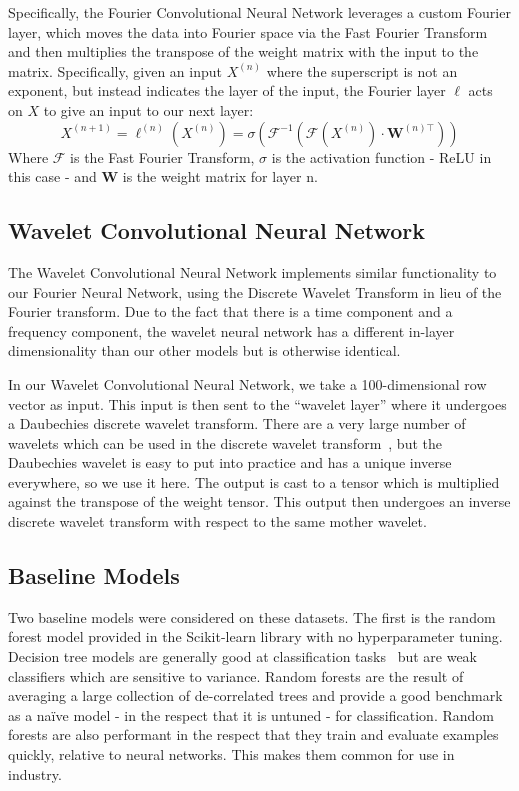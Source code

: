 Specifically, the Fourier Convolutional Neural Network leverages a custom Fourier layer, which moves the data into Fourier space via the Fast Fourier Transform and then multiplies the transpose of the weight matrix with the input to the matrix.
Specifically, given an input $X^{(n)}$ where the superscript is not an exponent, but instead indicates the layer of the input, the Fourier layer $\ell$ acts on $X$ to give an input to our next layer:
\begin{equation}
X^{(n+1)} = \ell^{(n)}(X^{(n)}) = \sigma(\mathcal{F}^{-1}(\mathcal{F}(X^{(n)})\cdot \mathbf{W}^{(n)\top}))
\end{equation}
\noindent Where $\mathcal{F}$ is the Fast Fourier Transform, $\sigma$ is the activation function - ReLU in this case - and $\mathbf{W}$ is the weight matrix for layer n.

\subsection{Wavelet Convolutional Neural Network} \label{wavelet cnn}
The Wavelet Convolutional Neural Network implements similar functionality to our Fourier Neural Network, using the Discrete Wavelet Transform in lieu of the Fourier transform.
Due to the fact that there is a time component and a frequency component, the wavelet neural network has a different in-layer dimensionality than our other models but is otherwise identical.

In our Wavelet Convolutional Neural Network, we take a 100-dimensional row vector as input.
This input is then sent to the ``wavelet layer'' where it undergoes a Daubechies discrete wavelet transform.
There are a very large number of wavelets which can be used in the discrete wavelet transform~\cite{mallat1999wavelet}, but the Daubechies wavelet is easy to put into practice and has a unique inverse everywhere, so we use it here.
The output is cast to a tensor which is multiplied against the transpose of the weight tensor.
This output then undergoes an inverse discrete wavelet transform with respect to the same mother wavelet.

\subsection{Baseline Models} \label{other models}
Two baseline models were considered on these datasets.
The first is the random forest model provided in the Scikit-learn library with no hyperparameter tuning.
Decision tree models are generally good at classification tasks~\cite{hastie01statisticallearning} but are weak classifiers which are sensitive to variance.
Random forests are the result of averaging a large collection of de-correlated trees and provide a good benchmark as a na\"ive model - in the respect that it is untuned - for classification.
Random forests are also performant in the respect that they train and evaluate examples quickly, relative to neural networks.
This makes them common for use in industry.


